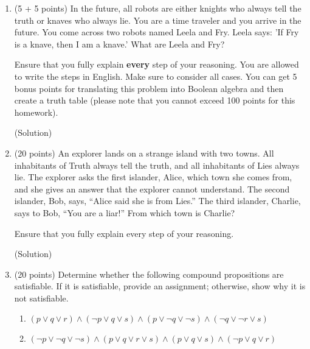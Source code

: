 \documentclass[letterpaper,12pt]{article}
\theoremstyle{plain}
\theoremstyle{definition}
\theoremstyle{remark}
\providecommand{\land}{\ensuremath{\wedge}}
\providecommand{\lor}{\ensuremath{\vee}}
\begin{document}
\begin{enumerate}
(Solution): %

\item (5 + 5 points)
In the future, all robots are either knights who always tell the truth or knaves who always lie. You are a time traveler and you arrive in the future. You come across two robots named %
Leela and Fry. Leela says: 'If Fry is a knave, then I am a knave.' What are Leela and Fry?

  Ensure that you fully explain \textbf{every} step of your reasoning. You are allowed to write the steps in English. Make sure to consider all cases. 
  You can get 5 bonus points for translating this problem into Boolean algebra and then create a truth table (please note that you cannot exceed 100 points for this homework).
  
(Solution)



 

\item (20 points)
  An explorer lands on a strange island with two towns.
  All inhabitants of Truth always tell the truth, and all inhabitants of Lies always lie.
  The explorer asks the first islander, Alice, which town she comes from, and she gives an answer that the explorer cannot understand.
  The second islander, Bob, says, ``Alice said she is from Lies.''
  The third islander, Charlie, says to Bob, ``You are a liar!''
  From which town is Charlie?

  Ensure that you fully explain every step of your reasoning.

(Solution)



\item (20 points)
  Determine whether the following compound propositions are satisfiable. If it is satisfiable, provide an assignment; otherwise, show why it is not satisfiable.
  \begin{enumerate}
  \item $(p \lor q \lor r) \land (\lnot p \lor q \lor s) \land (p \lor \lnot q \lor \lnot s) \land (\lnot q \lor \lnot r \lor s)$


  
  \item $(\lnot p \lor \lnot q \lor \lnot s) \land (p \lor q \lor r \lor s) \land (p \lor q \lor s) \land (\lnot p \lor q \lor r)$
  

  \end{enumerate}


\end{enumerate}
\end{document}
